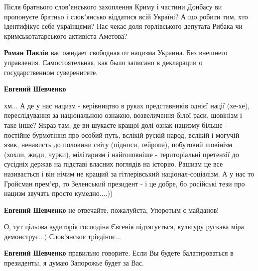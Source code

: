  
 
 
 
 
\zzSecCmt

\begin{itemize} %

Після братнього словʼянського захоплення Криму і частини Донбасу ви пропонуєте
братньо і словʼянсько віддатися всій Україні? А що робити тим, хто ідентифікує
себе українцями? Нас чекає доля горлівського депутата Рибака чи
кримськотатарського активіста Аметова?

\begin{itemize} %
\textbf{Роман Павлів} вас ожидает свободная от нацизма Украина. Без внешнего управления. Самостоятельная, как было записано в декларации о государственном суверенитете.

\textbf{Евгений Шевченко} 

хм... А де у нас нацизм - керівництво в руках представників однієї нації (хе-хе),
переслідування за національною ознакою, возвеличення білої раси, шовінізм і
таке інше? Якраз там, де ви шукаєте кращої долі ознак нацизму більше - постійне
бурмотіння про особий путь, вєлікій рускій народ, вєлікій і могучій язик,
ненависть до половини світу (підноси, гейропа), побутовий шовінізм (хохли, жиди,
чурки), мілітаризм і найголовніше - територіальні претензії до сусідніх держав
на підставі власних поглядів на історію. Рашизм це все називається і він нічим
не кращий за гітлерівський націонал-соціалізм. А у нас то Гройсман премʼєр, то
Зеленський президент - і це добре, бо російські тези про нацизм звучать просто
кумедно....))

\textbf{Евгений Шевченко} не отвечайте, пожалуйста, Упоротым с майданов!

О, тут цільова аудиторія господіна Євгенія підтягується, культуру рускава міра демонструє...) Слов'янскоє трієдіноє...

\textbf{Евгений Шевченко} правильно говорите. Если Вы будете балатироваться в президенты, я думаю Запорожье будет за Вас.
\end{itemize} %


\end{itemize}
